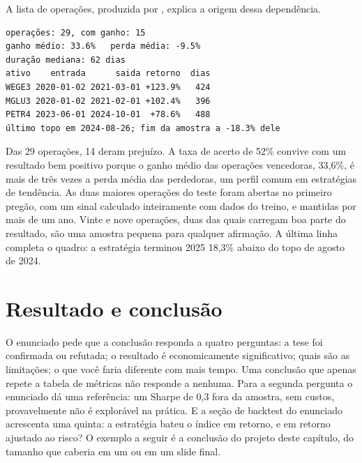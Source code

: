 
A lista de operações, produzida por , explica a origem dessa dependência.

\begin{lstlisting}[style=saida]
operações: 29, com ganho: 15
ganho médio: 33.6%   perda média: -9.5%
duração mediana: 62 dias
ativo    entrada      saida retorno  dias
WEGE3 2020-01-02 2021-03-01 +123.9%   424
MGLU3 2020-01-02 2021-02-01 +102.4%   396
PETR4 2023-06-01 2024-10-01  +78.6%   488
último topo em 2024-08-26; fim da amostra a -18.3% dele
\end{lstlisting}

Das 29 operações, 14 deram prejuízo. A taxa de acerto de 52\% convive com um resultado bem positivo porque o ganho médio das operações vencedoras, 33,6\%, é mais de três vezes a perda média das perdedoras, um perfil comum em estratégias de tendência. As duas maiores operações do teste foram abertas no primeiro pregão, com um sinal calculado inteiramente com dados do treino, e mantidas por mais de um ano. Vinte e nove operações, duas das quais carregam boa parte do resultado, são uma amostra pequena para qualquer afirmação. A última linha completa o quadro: a estratégia terminou 2025 18,3\% abaixo do topo de agosto de 2024.

\section{Resultado e conclusão}
\label{sec:c15-conclusao}

O enunciado pede que a conclusão responda a quatro perguntas: a tese foi confirmada ou refutada; o resultado é economicamente significativo; quais são as limitações; o que você faria diferente com mais tempo. Uma conclusão que apenas repete a tabela de métricas não responde a nenhuma. Para a segunda pergunta o enunciado dá uma referência: um Sharpe de 0,3 fora da amostra, sem custos, provavelmente não é explorável na prática. E a seção de backtest do enunciado acrescenta uma quinta: a estratégia bateu o índice em retorno, e em retorno ajustado ao risco? O exemplo a seguir é a conclusão do projeto deste capítulo, do tamanho que caberia em um  ou em um slide final.

